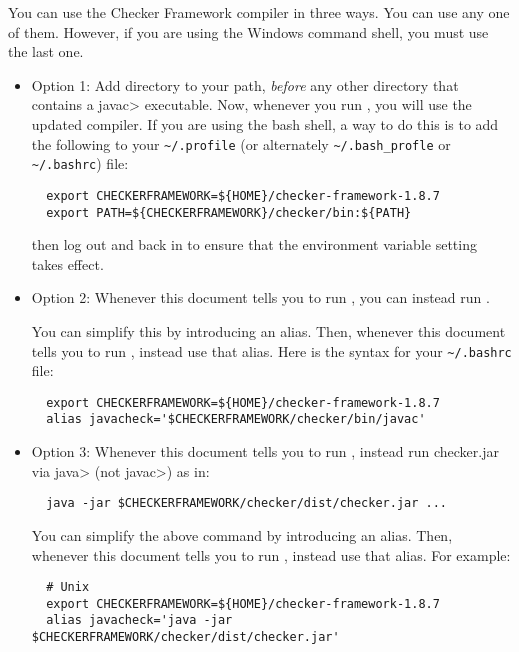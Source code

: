 You can use the Checker Framework compiler in three ways.  You can use any
one of them.  However, if you are using the Windows command shell, you must
use the last one.


\begin{itemize}
  \item
    Option 1:
    Add directory
     to your path, \emph{before} any other
    directory that contains a \<javac> executable.  Now, whenever
    you run , you will use the updated compiler.  If you are
    using the bash shell, a way to do this is to add the following to your
    \verb|~/.profile| (or alternately \verb|~/.bash_profle| or \verb|~/.bashrc|) file:
\begin{Verbatim}
  export CHECKERFRAMEWORK=${HOME}/checker-framework-1.8.7
  export PATH=${CHECKERFRAMEWORK}/checker/bin:${PATH}
\end{Verbatim}
    then log out and back in to ensure that the environment variable
    setting takes effect.
  \item
    Option 2:
    Whenever this document tells you to run , you
    can instead run .

    You can simplify this by introducing an alias.  Then,
    whenever this document tells you to run , instead use that
    alias.  Here is the syntax for your 
    \verb|~/.bashrc| file:
\begin{Verbatim}
  export CHECKERFRAMEWORK=${HOME}/checker-framework-1.8.7
  alias javacheck='$CHECKERFRAMEWORK/checker/bin/javac'
\end{Verbatim}

   \item
   Option 3:
   Whenever this document tells you to run , instead
   run checker.jar via \<java> (not \<javac>) as in:

\begin{Verbatim}
  java -jar $CHECKERFRAMEWORK/checker/dist/checker.jar ...
\end{Verbatim}

    You can simplify the above command by introducing an alias.  Then,
    whenever this document tells you to run , instead use that
    alias.  For example:

\begin{Verbatim}
  # Unix
  export CHECKERFRAMEWORK=${HOME}/checker-framework-1.8.7
  alias javacheck='java -jar $CHECKERFRAMEWORK/checker/dist/checker.jar'


\end{Verbatim}
\end{itemize}
